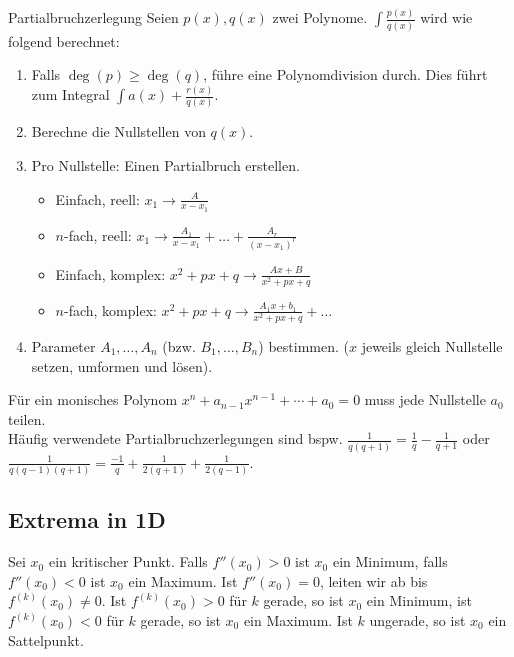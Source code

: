 \documentclass[a4paper,10pt]{article}
\begin{document}
\begin{mainbox}{Partialbruchzerlegung}
  Seien $p(x), q(x)$ zwei Polynome. $\int \frac{p(x)}{q(x)}$ wird wie folgend berechnet:
  \begin{enumerate}
   \item Falls $\deg(p) \ge \deg(q)$, führe eine Polynomdivision durch. Dies führt zum Integral $\int a(x) + \frac{r(x)}{q(x)}$.
   \item Berechne die Nullstellen von $q(x)$.
   \item Pro Nullstelle: Einen Partialbruch erstellen.
   \begin{itemize}[left=0pt]
    \item Einfach, reell: $x_1 \to \frac{A}{x - x_1}$
    \item $n$-fach, reell: $x_1 \to \frac{A_1}{x - x_1} + \ldots + \frac{A_r}{(x-x_1)^r}$ 
    \item Einfach, komplex: $x^2 + px + q \to \frac{Ax + B} {x^2 + px + q}$
    \item $n$-fach, komplex: $x^2 + px + q \to \frac{A_1x+b_1}{x^2+px+q} + \ldots$
   \end{itemize}
   \item Parameter $A_1, \ldots, A_n$ (bzw. $B_1, \ldots, B_n$) bestimmen. ($x$ jeweils gleich Nullstelle setzen, umformen und lösen).
 
  \end{enumerate}
 \end{mainbox}

Für ein monisches Polynom $x^n + a_{n-1} x^{n-1} + \cdots + a_0 = 0$ muss jede Nullstelle $a_0$ teilen.\\

Häufig verwendete Partialbruchzerlegungen sind bspw. $\frac{1}{q(q+1)} = \frac{1}{q} - \frac{1}{q + 1}$ oder $\frac{1}{q(q-1)(q+1)} = \frac{-1}{q} + \frac{1}{2(q+1)} + \frac{1}{2(q-1)}$.

\subsection{Extrema in 1D}

Sei $x_0$ ein kritischer Punkt. Falls $f''(x_0) > 0$ ist $x_0$ ein Minimum, falls $f''(x_0) < 0$ ist $x_0$ ein Maximum. Ist $f''(x_0) = 0$, leiten wir ab bis $f^{(k)}(x_0) \neq 0$. Ist $f^{(k)}(x_0) > 0$ für $k$ gerade, so ist $x_0$ ein Minimum, ist $f^{(k)}(x_0) < 0$ für $k$ gerade, so ist $x_0$ ein Maximum. Ist $k$ ungerade, so ist $x_0$ ein Sattelpunkt.
\end{document}
